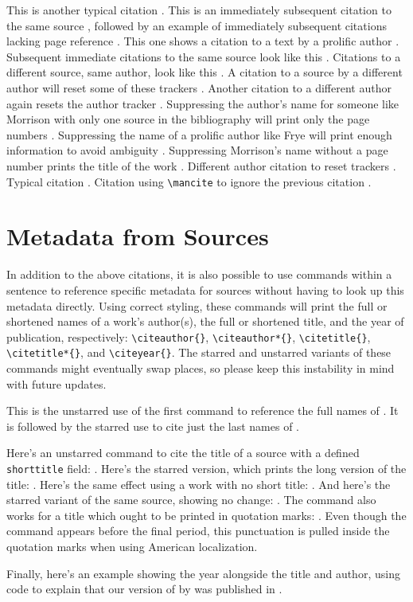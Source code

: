 \documentclass{article}
\begin{document}
This is another typical citation \autocite[12]{morrison02aa}. This is an immediately subsequent citation to the same source \autocite[34]{morrison02aa}, followed by an example of immediately subsequent citations lacking page reference \autocite{morrison02aa}. This one shows a citation to a text by a prolific author \autocite[12]{frye57ab}. Subsequent immediate citations to the same source look like this \autocite[34]{frye57ab}. Citations to a different source, same author, look like this \autocite[56]{frye91aa}. A citation to a source by a different author will reset some of these trackers \autocite[101]{morrison02aa}. Another citation to a different author again resets the author tracker \autocite[78]{frye91aa}. Suppressing the author's name for someone like Morrison with only one source in the bibliography will print only the page numbers \autocite*[102]{morrison02aa}. Suppressing the name of a prolific author like Frye will print enough information to avoid ambiguity \autocite*[91]{frye57ab}. Suppressing Morrison's name without a page number prints the title of the work \autocite*{morrison02aa}. Different author citation to reset trackers \autocite[91]{frye91aa}. Typical citation \autocite[12]{morrison02aa}. Citation using \verb|\mancite| to ignore the previous citation \mancite\autocite[34]{morrison02aa}.

\section{Metadata from Sources}
In addition to the above citations, it is also possible to use commands within a sentence to reference specific metadata for sources without having to look up this metadata directly. Using correct styling, these commands will print the full or shortened names of a work's author(s), the full or shortened title, and the year of publication, respectively: \verb|\citeauthor{}|, \verb|\citeauthor*{}|, \verb|\citetitle{}|, \verb|\citetitle*{}|, and \verb|\citeyear{}|. The starred and unstarred variants of these commands might eventually swap places, so please keep this instability in mind with future updates.

This is the unstarred use of the first command to reference the full names of \citeauthor{appiah92aa}. It is followed by the starred use to cite just the last names of \citeauthor*{appiah92aa}. 

Here's an unstarred command to cite the title of a source with a defined \verb!shorttitle! field: . Here's the starred version, which prints the long version of the title: . Here's the same effect using a work with no short title: . And here's the starred variant of the same source, showing no change: . The command also works for a title which ought to be printed in quotation marks: . Even though the command appears before the final period, this punctuation is pulled inside the quotation marks when using American localization.

Finally, here's an example showing the year alongside the title and author, using code to explain that our version of  by \citeauthor{interview:amis} was published in \citeyear{interview:amis}.

\nocite{*}

\printbibliography
\end{document}
